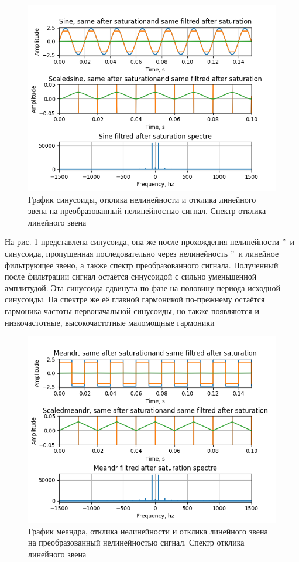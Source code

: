 \begin{figure}[H]
	\centering
	\includegraphics[width=0.95\linewidth]{body/images/sine-after-filtred-saturation-and-its-spectre.png}
	\caption{График синусоиды, отклика нелинейности и отклика линейного звена на преобразованный
	нелинейностью сигнал. Спектр отклика линейного звена}
	\label{fig:28}
\end{figure}

На рис. \ref{fig:28} представлена синусоида, она же после прохождения
нелинейности \textquotedblright\ и синусоида,
пропущенная последовательно через нелинейность \textquotedblright\
и линейное фильтрующее звено, а также спектр преобразованного сигнала.
Полученный после фильтрации сигнал остаётся синусоидой с сильно 
уменьшенной амплитудой. Эта синусоида сдвинута по фазе на половину периода исходной
синусоиды. На спектре же её главной гармоникой по-прежнему остаётся гармоника частоты
первоначальной синусоиды, но также появляются и низкочастотные, высокочастотные
маломощные гармоники

\begin{figure}[H]
	\centering
	\includegraphics[width=0.95\linewidth]{body/images/meandr-after-filtred-saturation-and-its-spectre.png}
	\caption{График меандра, отклика нелинейности и отклика линейного звена на преобразованный
	нелинейностью сигнал. Спектр отклика линейного звена}
	\label{fig:29}
\end{figure}

